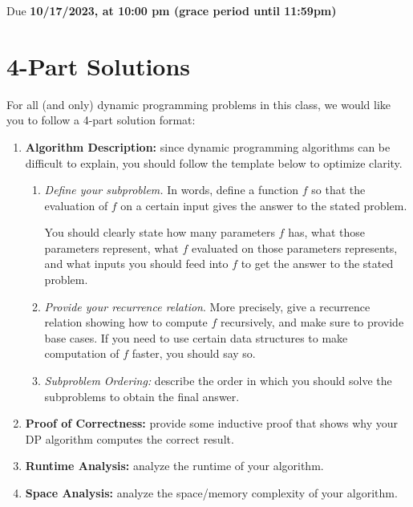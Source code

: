 \documentclass[11pt]{article}
\def\duedate{10/17/2023, at 10:00 pm (grace period until 11:59pm)}
\begin{document}
\maketitle


Due \textbf{\duedate}

\section*{4-Part Solutions}

For all (and only) dynamic programming problems in this class, we would like you to follow a 4-part solution format:

\begin{enumerate}
    \item \textbf{Algorithm Description:} since dynamic programming algorithms can be difficult to explain, you should follow the template below to optimize clarity.
    \begin{enumerate}
        \item \textit{Define your subproblem.} In words, define a function $f$ so that the evaluation of $f$ on a certain input gives the answer to the stated problem.
        
        You should clearly state how many parameters $f$ has, what those parameters represent, what $f$ evaluated on those parameters represents, and what inputs you should feed into $f$ to get the answer to the stated problem.
        
        \item \textit{Provide your recurrence relation}. More precisely, give a recurrence relation showing how to compute $f$ recursively, and make sure to provide base cases. If you need to use certain data structures to make computation of $f$ faster, you should say so.
        
        \item \textit{Subproblem Ordering:} describe the order in which you should solve the subproblems to obtain the final answer.
    \end{enumerate}

    \item \textbf{Proof of Correctness:} provide some inductive proof that shows why your DP algorithm computes the correct result.

    \item \textbf{Runtime Analysis:} analyze the runtime of your algorithm.

    \item \textbf{Space Analysis:} analyze the space/memory complexity of your algorithm.
\end{enumerate}
\end{document}

